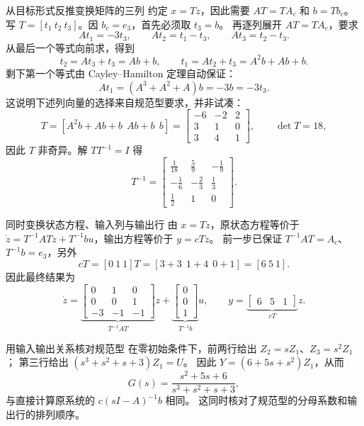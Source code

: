 \documentclass[11pt]{article}
\begin{document}
\begin{solution}
\begin{proofstep}{从目标形式反推变换矩阵的三列}
约定 $x=Tz$，因此需要 $AT=TA_c$ 和 $b=Tb_c$。
写 $T=[t_1\ t_2\ t_3]$。因 $b_c=e_3$，首先必须取 $t_3=b$。
再逐列展开 $AT=TA_c$，要求
\[
At_1=-3t_3,\qquad At_2=t_1-t_3,\qquad At_3=t_2-t_3.
\]
从最后一个等式向前求，得到
\[
t_2=At_3+t_3=Ab+b,\qquad
t_1=At_2+t_3=A^2b+Ab+b.
\]
剩下第一个等式由 Cayley--Hamilton 定理自动保证：
\[
At_1=(A^3+A^2+A)b=-3b=-3t_3.
\]
这说明下述列向量的选择来自规范型要求，并非试凑：
\[
T=[A^2b+Ab+b\ \ Ab+b\ \ b]
=\begin{bmatrix}-6&-2&2\\3&1&0\\3&4&1\end{bmatrix},
\qquad \det T=18,
\]
因此 $T$ 非奇异。解 $TT^{-1}=I$ 得
\[
T^{-1}=\begin{bmatrix}
\tfrac1{18}&\tfrac59&-\tfrac19\\
-\tfrac16&-\tfrac23&\tfrac13\\
\tfrac12&1&0
\end{bmatrix}.
\]
\end{proofstep}

\pagebreak
\begin{proofstep}{同时变换状态方程、输入列与输出行}
由 $x=Tz$，原状态方程等价于
$\dot z=T^{-1}ATz+T^{-1}bu$，输出方程等价于 $y=cTz$。
前一步已保证 $T^{-1}AT=A_c$、$T^{-1}b=e_3$，另外
\[
cT=[0\ 1\ 1]T=[3+3\ \ 1+4\ \ 0+1]=[6\ 5\ 1].
\]
因此最终结果为
\[
\boxed{
\dot z=\underbrace{\begin{bmatrix}0&1&0\\0&0&1\\-3&-1&-1\end{bmatrix}}_{T^{-1}AT}z
+\underbrace{\begin{bmatrix}0\\0\\1\end{bmatrix}}_{T^{-1}b}u,
\qquad y=\underbrace{\begin{bmatrix}6&5&1\end{bmatrix}}_{cT}z.}
\]
\end{proofstep}

\begin{proofstep}{用输入输出关系核对规范型}
在零初始条件下，前两行给出 $Z_2=sZ_1$、$Z_3=s^2Z_1$；
第三行给出 $(s^3+s^2+s+3)Z_1=U$。
因此 $Y=(6+5s+s^2)Z_1$，从而
\[
G(s)=\frac{s^2+5s+6}{s^3+s^2+s+3},
\]
与直接计算原系统的 $c(sI-A)^{-1}b$ 相同。
这同时核对了规范型的分母系数和输出行的排列顺序。
\end{proofstep}
\end{solution}
\end{document}
